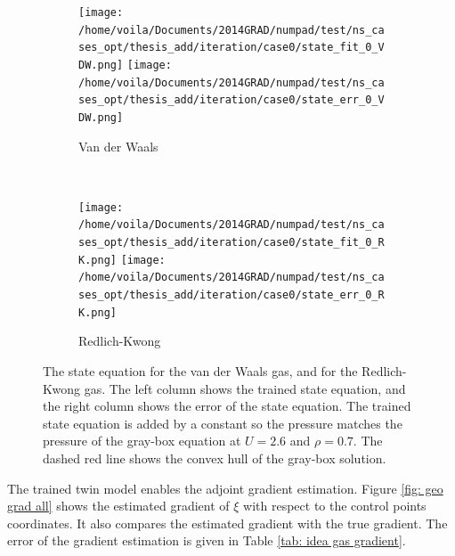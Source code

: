 \begin{figure}[htbp]\begin{center}
    \begin{subfigure}[t]{.99\textwidth}
        \centering
        \texttt{[image: /home/voila/Documents/2014GRAD/numpad/test/ns\_cases\_opt/thesis\_add/iteration/case0/state\_fit\_0\_VDW.png]}
        \texttt{[image: /home/voila/Documents/2014GRAD/numpad/test/ns\_cases\_opt/thesis\_add/iteration/case0/state\_err\_0\_VDW.png]}
        \caption{Van der Waals}
        \label{fig: state err VDW}
    \end{subfigure}\\
    \begin{subfigure}[t]{.99\textwidth}
        \centering
        \texttt{[image: /home/voila/Documents/2014GRAD/numpad/test/ns\_cases\_opt/thesis\_add/iteration/case0/state\_fit\_0\_RK.png]}
        \texttt{[image: /home/voila/Documents/2014GRAD/numpad/test/ns\_cases\_opt/thesis\_add/iteration/case0/state\_err\_0\_RK.png]}
        \caption{Redlich-Kwong}
        \label{fig: state err RK}
    \end{subfigure}
    \caption{The state equation for the van der Waals gas, and for the
             Redlich-Kwong gas.
             The left column shows the trained state equation, and the right
             column shows the error of the state equation. The trained state equation
             is added by a constant so the pressure matches the pressure of the
             gray-box equation at $U=2.6$ and $\rho=0.7$. The dashed red line shows
             the convex hull of the gray-box solution.}
    \label{fig: state RK}
\end{center}\end{figure}


The trained twin model enables the adjoint gradient estimation.
Figure \ref{fig: geo grad all} shows the
estimated gradient of $\xi$ with respect to the control points coordinates. It also
compares the estimated gradient with the true gradient. 
The error of the gradient estimation is given in Table \ref{tab: idea gas gradient}.

